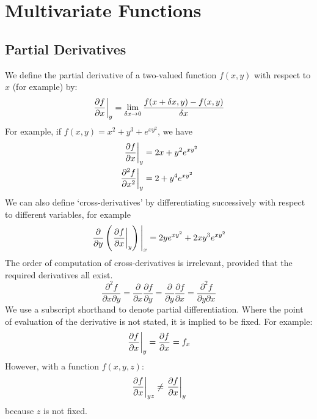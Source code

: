 \documentclass{article}
\begin{document}
\section{Multivariate Functions}
\subsection{Partial Derivatives}
We define the partial derivative of a two-valued function $f(x, y)$ with respect to $x$ (for example) by:
\begin{equation}
	\eval{\frac{\partial f}{\partial x}}_{y} = \lim_{\delta x\to 0} \frac{f(x + \delta x, y) - f(x, y)}{\delta x}
\end{equation}
For example, if $f(x,y) = x^2 + y^3 + e^{xy^2}$, we have
\begin{align*}
	\eval{\frac{\partial f}{\partial x}}_{y}     & = 2x + y^2 e^{xy^2} \\
	\eval{\frac{\partial^2 f}{\partial x^2}}_{y} & = 2 + y^4 e^{xy^2}
\end{align*}
We can also define `cross-derivatives' by differentiating successively with respect to different variables, for example
\[ \eval{\frac{\partial}{\partial y} \left( \eval{\frac{\partial f}{\partial x}}_{y} \right)}_{x} = 2ye^{xy^2} + 2xy^3e^{xy^2} \]
The order of computation of cross-derivatives is irrelevant, provided that the required derivatives all exist.
\begin{equation}
	\frac{\partial^2 f}{\partial x \partial y} = \frac{\partial}{\partial x}\frac{\partial f}{\partial y} = \frac{\partial}{\partial y}\frac{\partial f}{\partial x} = \frac{\partial^2 f}{\partial y \partial x}
\end{equation}
We use a subscript shorthand to denote partial differentiation. Where the point of evaluation of the derivative is not stated, it is implied to be fixed. For example:
\[ \eval{\frac{\partial f}{\partial x}}_{y} = \frac{\partial f}{\partial x} = f_x \]
However, with a function $f(x, y, z)$:
\[ \eval{\frac{\partial f}{\partial x}}_{yz} \neq \eval{\frac{\partial f}{\partial x}}_{y} \]
because $z$ is not fixed.
\end{document}
